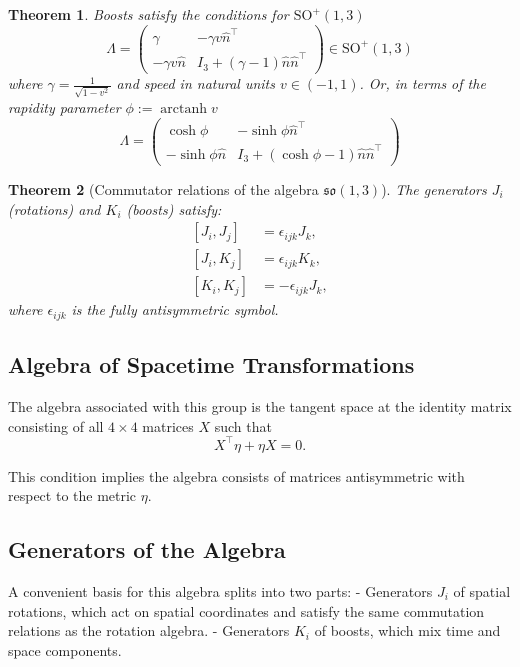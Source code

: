 \documentclass{amsart}
\newtheorem{theorem}{Theorem}[section]
\theoremstyle{remark}
\DeclareMathOperator{\arctanh}{arctanh}
\begin{document}
\begin{theorem}
  Boosts satisfy the conditions for $\mathrm{SO}^+(1,3)$
  \[
  \Lambda =
  \begin{pmatrix}
    \gamma & -\gamma v \hat{n}^\top \\
    -\gamma v \hat{n} & I_3 + \left(\gamma-1\right)\hat{n}\hat{n}^\top
  \end{pmatrix} \in \mathrm{SO}^+(1,3)
  \]
  where $\gamma=\frac{1}{\sqrt{1-v^2}}$ and \emph{speed} in natural units $v\in(-1,1)$. Or, in terms of the \emph{rapidity} parameter $\phi:=\arctanh v$
  \[
  \Lambda =
  \begin{pmatrix}
    \cosh \phi & -\sinh \phi \hat{n}^\top \\
    -\sinh \phi \hat{n} & I_3 + (\cosh \phi - 1) \hat{n} \hat{n}^\top
  \end{pmatrix}
  \]
\end{theorem}

\begin{theorem}[Commutator relations of the algebra $\mathfrak{so}(1,3)$]
  The generators $J_i$ (rotations) and $K_i$ (boosts) satisfy:
  \[
  \begin{aligned}
    [J_i, J_j] &= \epsilon_{ijk} J_k, \\
    [J_i, K_j] &= \epsilon_{ijk} K_k, \\
    [K_i, K_j] &= -\epsilon_{ijk} J_k,
  \end{aligned}
  \]
  where $\epsilon_{ijk}$ is the fully antisymmetric symbol.
\end{theorem}

\subsection{Algebra of Spacetime Transformations}

The algebra associated with this group is the tangent space at the identity matrix consisting of all \(4 \times 4\) matrices \(X\) such that
\[
X^\top \eta + \eta X = 0.
\]

This condition implies the algebra consists of matrices antisymmetric with respect to the metric \(\eta\).

\subsection{Generators of the Algebra}

A convenient basis for this algebra splits into two parts:
- Generators \(J_i\) of spatial rotations, which act on spatial coordinates and satisfy the same commutation relations as the rotation algebra.
- Generators \(K_i\) of boosts, which mix time and space components.
\end{document}

